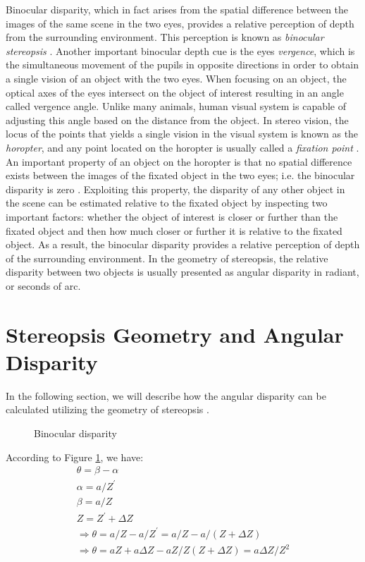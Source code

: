 Binocular disparity, which in fact arises from the spatial difference 
between the images of the same scene in the two eyes, provides a relative perception of depth from the surrounding environment. This perception is known as {\it binocular stereopsis} \cite{how95}. 
Another important binocular depth cue is the eyes {\it vergence}, which is the simultaneous movement of the pupils in opposite directions in order to obtain a single vision of an object with the
two eyes. When focusing on an object, the optical axes of the eyes intersect on the object of interest resulting in an angle called vergence angle. Unlike many animals, human visual system 
is capable of adjusting this angle based on the distance from the object.
In stereo vision, the locus of the points that yields a single vision in the visual system is known as the {\it horopter}, and any point located on the horopter is usually called a 
{\it fixation point} \cite{binr83,how95}.
An important property of an object on the horopter is that no spatial difference
exists between the images of the fixated object in the two eyes; i.e. the binocular disparity is zero \cite{how95}. 
Exploiting this property, the disparity of any other object in the scene can be estimated relative to the fixated object by inspecting two important factors: 
whether the object of interest is closer or further than the fixated object and then how much closer or further it is relative to the fixated object.
As a result, the binocular disparity provides a relative perception of depth of the surrounding environment.
In the geometry of stereopsis, the relative disparity between two objects is usually presented as angular disparity in radiant, or seconds of arc.

\section{Stereopsis Geometry and Angular Disparity}

In the following section, we will describe how the angular disparity can be calculated utilizing the geometry of stereopsis \cite{binr83}.

\begin{figure}[h!]
\centering

\caption{Binocular disparity}
\label{fig:stereopsis}
\end{figure} 

According to Figure \ref{fig:stereopsis}, we have:
\begin{align}
\theta = \beta - \alpha\\
\alpha = a/Z^{'}\\
\beta = a/Z\\
Z = Z^{'} + \Delta Z\\
\Rightarrow \theta = a/Z - a/Z^{'} = a/Z - a/(Z+\Delta Z) \\
\Rightarrow \theta = aZ+a\Delta Z-aZ/Z(Z+\Delta Z) = a\Delta Z/Z^{2} 
\end{align}


